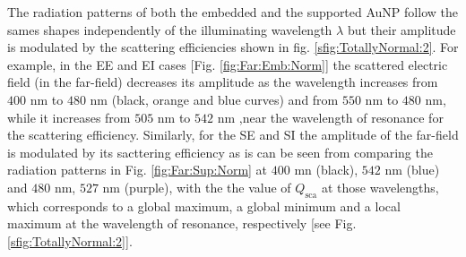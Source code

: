 The radiation patterns of both the embedded  and the supported AuNP follow the sames shapes independently of the illuminating wavelength $\lambda$ but their amplitude is modulated by the scattering efficiencies shown in fig. \ref{sfig:TotallyNormal:2}. For example, in the EE  and EI cases [Fig. \ref{fig:Far:Emb:Norm}] the scattered electric field (in the far-field) decreases its amplitude as the wavelength increases from $400$ nm to $480$ nm (black, orange and blue curves) and from   $550$ nm to $480$  nm, while it increases from $505$ nm to $542$ nm ,near the wavelength of resonance for the scattering efficiency. Similarly, for the SE and SI  the amplitude of the far-field is modulated by its sacttering efficiency as is can be seen from comparing the radiation patterns in Fig. \ref{fig:Far:Sup:Norm} at $400$ mn (black), $542$ nm (blue) and $480$ nm, $527$ nm (purple), with the the value of $Q_\text{sca}$ at those wavelengths, which corresponds to a global maximum, a global minimum and a local maximum at the wavelength of resonance, respectively [see Fig. \ref{sfig:TotallyNormal:2}].

